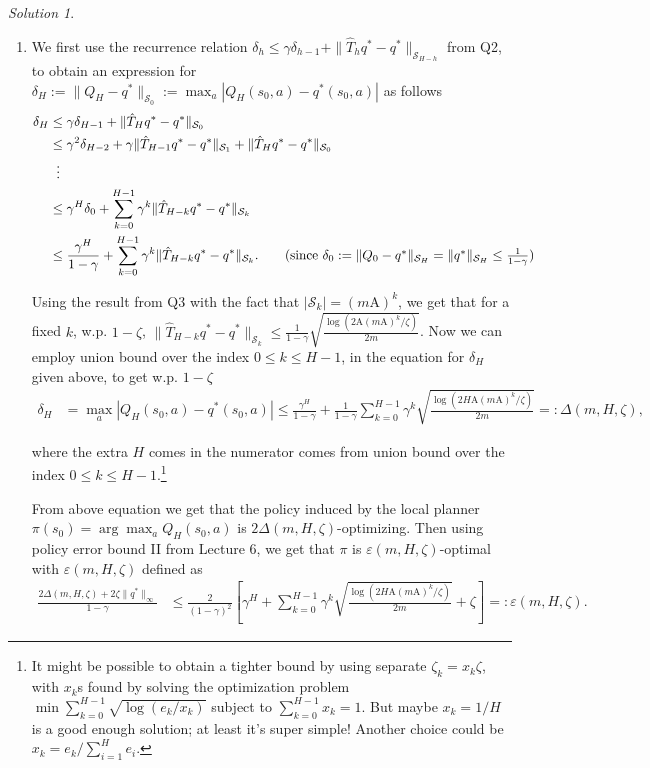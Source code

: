 \documentclass{article}
\DeclareMathOperator*{\1}{\mathbbm{1}}
\newcommand{\0}{\mathbf{0}}
\theoremstyle{definition}
\theoremstyle{remark}
\newtheorem*{solution*}{Solution}
\newcommand{\cS}{\mathcal{S}}
\begin{document}
\begin{solution*}
\begin{enumerate}
\item We first use the recurrence relation $\delta_h \leq \gamma \delta_{h-1} + \|\hat{T}_h q^* - q^*\|_{\cS_{H-h}}$ from Q2, to obtain an expression for $\delta_H := \|Q_H - q^*\|_{\cS_0} := \max_{a} |Q_H(s_0, a) - q^*(s_0, a)|$ as follows
  \begin{align*}
    \delta_H &\leq \gamma \delta_{H-1} + \|\hat{T}_H q^* - q^*\|_{\cS_{0}} \\
    &\leq \gamma^2 \delta_{H-2} + \gamma \|\hat{T}_{H-1} q^* - q^*\|_{\cS_{1}} + \|\hat{T}_H q^* - q^*\|_{\cS_{0}} \\
    & \;\; \vdots \\
    &\leq \gamma^H \delta_0 + \sum_{k=0}^{H-1} \gamma^k \|\hat{T}_{H-k} q^* - q^*\|_{\cS_{k}} \\
    &\leq \frac{\gamma^H}{1 - \gamma} + \sum_{k=0}^{H-1} \gamma^k \|\hat{T}_{H-k} q^* - q^*\|_{\cS_{k}}. \tag*{(since $\delta_0 := \|Q_0 - q^*\|_{\cS_H} = \|q^*\|_{\cS_H} \leq \frac{1}{1 - \gamma}$)}
  \end{align*}

  Using the result from Q3 with the fact that $|\cS_k| = (m\mathrm{A})^k$, we get that for a fixed $k$, w.p. $1 - \zeta$, $\|\hat{T}_{H-k} q^* - q^*\|_{\cS_{k}} \leq \frac{1}{1 - \gamma} \sqrt{\frac{\log(2 \mathrm{A} (m\mathrm{A})^{k} / \zeta)}{2m}}$. Now we can employ union bound over the index $0 \leq k \leq H-1$, in the equation for $\delta_H$ given above, to get w.p. $1 - \zeta$
  \begin{align*}
    \delta_H &= \max_{a} |Q_H(s_0, a) - q^*(s_0, a)| \leq \frac{\gamma^H}{1 - \gamma} + \frac{1}{1 - \gamma} \sum_{k=0}^{H-1} \gamma^k \sqrt{\frac{\log(2 H \mathrm{A} (m\mathrm{A})^{k} / \zeta)}{2m}} =: \Delta(m, H, \zeta),
  \end{align*}

  where the extra $H$ comes in the numerator comes from union bound over the index $0 \leq k \leq H-1$.\footnote{It might be possible to obtain a tighter bound by using separate $\zeta_k = x_k \zeta$, with $x_k$s found by solving the optimization problem $\min \sum_{k=0}^{H-1} \sqrt{\log(e_k / x_k)}$ subject to $\sum_{k=0}^{H-1} x_k = 1$. But maybe $x_k = 1/H$ is a good enough solution; at least it's super simple! Another choice could be $x_k = e_k \big/ \sum_{i=1}^{H} e_i$.}

  From above equation we get that the policy induced by the local planner $\pi(s_0) = \arg \max_a Q_H(s_0, a)$ is $2 \Delta(m, H, \zeta)$-optimizing. Then using policy error bound II from Lecture 6, we get that $\pi$ is $\varepsilon(m, H, \zeta)$-optimal with $\varepsilon(m, H, \zeta)$ defined as
  \begin{align*}
    \frac{2 \Delta(m, H, \zeta) + 2 \zeta \|q^*\|_\infty}{1 - \gamma} &\leq \frac{2}{(1 - \gamma)^2} \left[ \gamma^H + \sum_{k=0}^{H-1} \gamma^k \sqrt{\frac{\log(2 H \mathrm{A} (m\mathrm{A})^{k} / \zeta)}{2m}} + \zeta \right] =: \varepsilon(m , H, \zeta).
  \end{align*}


\end{enumerate}
\end{solution*}
\end{document}
